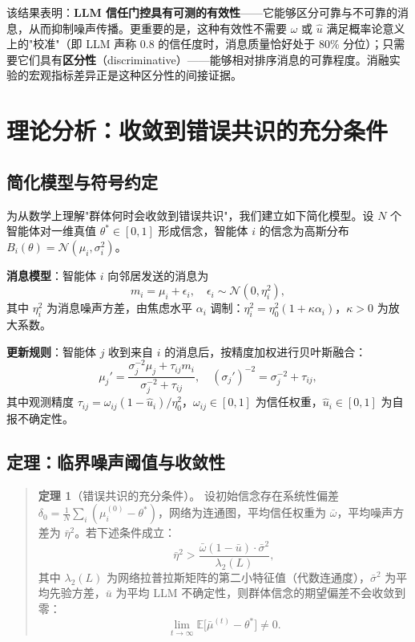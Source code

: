 \documentclass[UTF8, a4paper, 11pt]{ctexart}
\begin{document}
该结果表明：\textbf{LLM 信任门控具有可测的有效性}——它能够区分可靠与不可靠的消息，从而抑制噪声传播。更重要的是，这种有效性不需要 $\omega$ 或 $\hat{u}$ 满足概率论意义上的"校准"（即 LLM 声称 0.8 的信任度时，消息质量恰好处于 80\% 分位）；只需要它们具有\textbf{区分性}（discriminative）——能够相对排序消息的可靠程度。消融实验的宏观指标差异正是这种区分性的间接证据。

\section{理论分析：收敛到错误共识的充分条件}
\label{sec:theory}

\subsection{简化模型与符号约定}
为从数学上理解"群体何时会收敛到错误共识"，我们建立如下简化模型。设 $N$ 个智能体对一维真值 $\theta^*\in[0,1]$ 形成信念，智能体 $i$ 的信念为高斯分布 $B_i(\theta)=\mathcal{N}(\mu_i, \sigma_i^2)$。

\textbf{消息模型}：智能体 $i$ 向邻居发送的消息为
\[
m_i = \mu_i + \epsilon_i,\quad \epsilon_i\sim\mathcal{N}(0, \eta_i^2),
\]
其中 $\eta_i^2$ 为消息噪声方差，由焦虑水平 $\alpha_i$ 调制：$\eta_i^2 = \eta_0^2(1+\kappa\alpha_i)$，$\kappa > 0$ 为放大系数。

\textbf{更新规则}：智能体 $j$ 收到来自 $i$ 的消息后，按精度加权进行贝叶斯融合：
\[
\mu_j' = \frac{\sigma_j^{-2}\mu_j + \tau_{ij}m_i}{\sigma_j^{-2}+\tau_{ij}},\quad
(\sigma_j')^{-2} = \sigma_j^{-2} + \tau_{ij},
\]
其中观测精度 $\tau_{ij} = \omega_{ij}(1-\hat{u}_i)/\eta_0^2$，$\omega_{ij}\in[0,1]$ 为信任权重，$\hat{u}_i\in[0,1]$ 为自报不确定性。

\subsection{定理：临界噪声阈值与收敛性}

\begin{quote}
\textbf{定理 1}（错误共识的充分条件）。
设初始信念存在系统性偏差 $\delta_0 = \frac{1}{N}\sum_i(\mu_i^{(0)}-\theta^*)$，网络为连通图，平均信任权重为 $\bar{\omega}$，平均噪声方差为 $\bar{\eta}^2$。若下述条件成立：
\begin{equation}
\bar{\eta}^2 > \frac{\bar{\omega}(1-\bar{u})\cdot\bar{\sigma}^2}{\lambda_2(L)},
\label{eq:critical_noise}
\end{equation}
其中 $\lambda_2(L)$ 为网络拉普拉斯矩阵的第二小特征值（代数连通度），$\bar{\sigma}^2$ 为平均先验方差，$\bar{u}$ 为平均 LLM 不确定性，则群体信念的期望偏差不会收敛到零：
\[
\lim_{t\to\infty}\mathbb{E}\big[\bar{\mu}^{(t)}-\theta^*\big] \neq 0.
\]
\end{quote}
\end{document}
